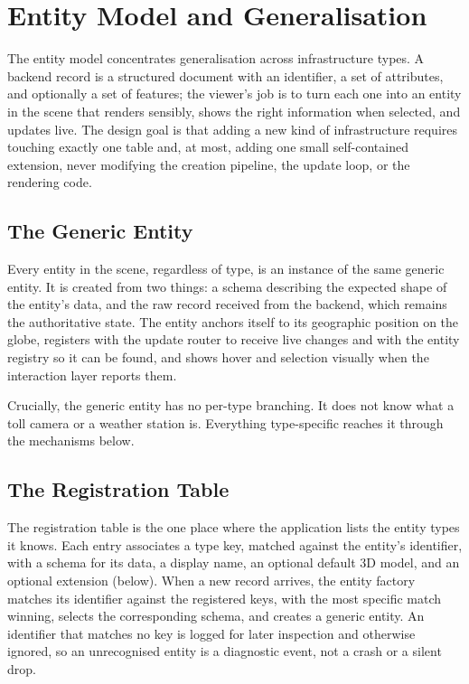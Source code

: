 \section{Entity Model and Generalisation}
\label{sec:entity-model}

The entity model concentrates generalisation across infrastructure types. A backend record is a structured document with an identifier, a set of attributes, and optionally a set of features; the viewer's job is to turn each one into an entity in the scene that renders sensibly, shows the right information when selected, and updates live. The design goal is that adding a new kind of infrastructure requires touching exactly one table and, at most, adding one small self-contained extension, never modifying the creation pipeline, the update loop, or the rendering code.

\subsection{The Generic Entity}

Every entity in the scene, regardless of type, is an instance of the same generic entity. It is created from two things: a schema describing the expected shape of the entity's data, and the raw record received from the backend, which remains the authoritative state. The entity anchors itself to its geographic position on the globe, registers with the update router to receive live changes and with the entity registry so it can be found, and shows hover and selection visually when the interaction layer reports them.

Crucially, the generic entity has no per-type branching. It does not know what a toll camera or a weather station is. Everything type-specific reaches it through the mechanisms below.

\subsection{The Registration Table}

The registration table is the one place where the application lists the entity types it knows. Each entry associates a type key, matched against the entity's identifier, with a schema for its data, a display name, an optional default 3D model, and an optional extension (below). When a new record arrives, the entity factory matches its identifier against the registered keys, with the most specific match winning, selects the corresponding schema, and creates a generic entity. An identifier that matches no key is logged for later inspection and otherwise ignored, so an unrecognised entity is a diagnostic event, not a crash or a silent drop.

